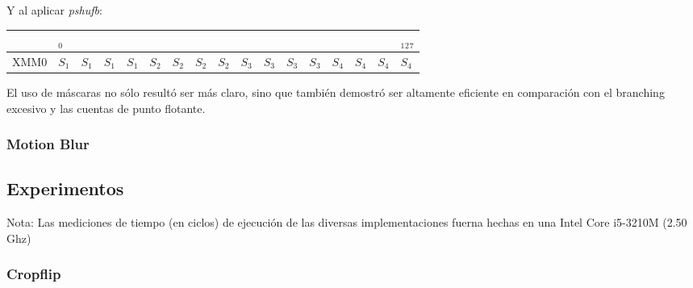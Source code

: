 \documentclass[a4paper]{article}
\begin{document}
\begin{itemize}
\begin{itemize}
\begin{table}[h]
\center
Y al aplicar \textit{pshufb}:
\begin{tabular}{lllllllllllllllll}
                           & $_0$                       &                        &                        &                        &                            &                        &                        &                        &                            &                        &                        &                        &                            &                        &                        & $_1$$_2$$_7$                    \\ \hline
\multicolumn{1}{|l|}{XMM0} & \multicolumn{1}{l|}{$S_1$} & \multicolumn{1}{l|}{$S_1$} & \multicolumn{1}{l|}{$S_1$} & \multicolumn{1}{l|}{$S_1$} & \multicolumn{1}{l|}{$S_2$} & \multicolumn{1}{l|}{$S_2$} & \multicolumn{1}{l|}{$S_2$} & \multicolumn{1}{l|}{$S_2$} & \multicolumn{1}{l|}{$S_3$} & \multicolumn{1}{l|}{$S_3$} & \multicolumn{1}{l|}{$S_3$} & \multicolumn{1}{l|}{$S_3$} & \multicolumn{1}{l|}{$S_4$} & \multicolumn{1}{l|}{$S_4$} & \multicolumn{1}{l|}{$S_4$} & \multicolumn{1}{l|}{$S_4$} \\ \hline
\end{tabular}
\end{table}

El uso de m\'{a}scaras no s\'{o}lo result\'{o} ser m\'{a}s claro, sino que tambi\'{e}n demostr\'{o} ser altamente eficiente en comparaci\'{o}n con el branching excesivo y las cuentas de punto flotante.
\end{itemize}
\end{itemize}

\subsubsection{Motion Blur}

\newpage

\subsection{Experimentos}

Nota: Las mediciones de tiempo (en ciclos) de ejecuci\'{o}n de las diversas implementaciones fuerna hechas en una Intel Core i5-3210M (2.50 Ghz)

\subsubsection{Cropflip}
\end{document}

